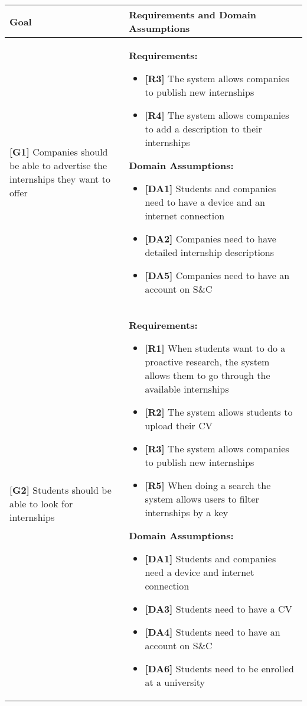 \begin{longtable}{|p{}|p{}|}
\hline
\textbf{Goal} & \textbf{Requirements and Domain Assumptions} \\
\hline
\textbf{[G1]} Companies should be able to advertise the internships they want to offer 
& 
\textbf{Requirements:}
\begin{itemize}
    \item \textbf{[R3]} The system allows companies to publish new internships
    \item \textbf{[R4]} The system allows companies to add a description to their internships
\end{itemize}
\textbf{Domain Assumptions:}
\begin{itemize}
    \item \textbf{[DA1]} Students and companies need to have a device and an internet connection
    \item \textbf{[DA2]} Companies need to have detailed internship descriptions
    \item \textbf{[DA5]} Companies need to have an account on S\&C
\end{itemize} \\
\hline
\textbf{[G2]} Students should be able to look for internships 
& 
\textbf{Requirements:}
\begin{itemize}
    \item \textbf{[R1]} When students want to do a proactive research, the system allows them to go through the available internships
    \item \textbf{[R2]} The system allows students to upload their CV
    \item \textbf{[R3]} The system allows companies to publish new internships
    \item \textbf{[R5]} When doing a search the system allows users to filter internships by a key
\end{itemize}
\textbf{Domain Assumptions:}
\begin{itemize}
    \item \textbf{[DA1]} Students and companies need a device and internet connection
    \item \textbf{[DA3]} Students need to have a CV
    \item \textbf{[DA4]} Students need to have an account on S\&C
    \item \textbf{[DA6]} Students need to be enrolled at a university
\end{itemize} \\

\end{longtable}
